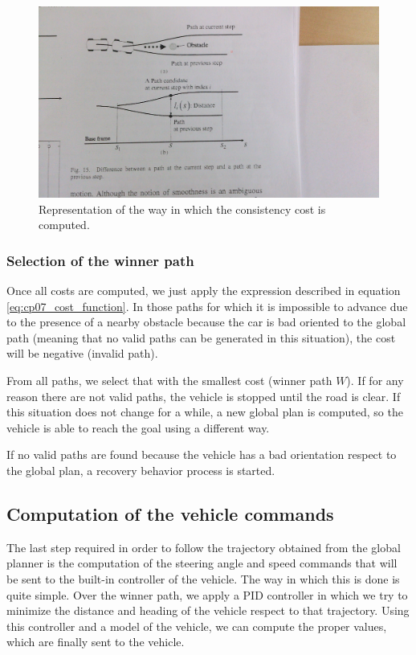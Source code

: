 \begin{figure}[h!]
  \centering
  \includegraphics[width=\textwidth]{consistency_cost}
  \caption{Representation of the way in which the consistency cost is computed.}\label{fig:cp07_consistency_cost}
\end{figure}

\subsubsection{Selection of the winner path}\label{ch:chapter07_01_04_01}

Once all costs are computed, we just apply the expression described in equation \ref{eq:cp07_cost_function}. In those paths for which it is impossible to advance due to the presence of a nearby obstacle because the car is bad oriented to the global path (meaning that no valid paths can be generated in this situation), the cost will be negative (invalid path).

From all paths, we select that with the smallest cost (winner path $W$). If for any reason there are not valid paths, the vehicle is stopped until the road is clear. If this situation does not change for a while, a new global plan is computed, so the vehicle is able to reach the goal using a different way.

If no valid paths are found because the vehicle has a bad orientation respect to the global plan, a recovery behavior process is started.

\subsection{Computation of the vehicle commands}\label{ch:chapter07_01_05}

The last step required in order to follow the trajectory obtained from the global planner is the computation of the steering angle and speed commands that will be sent to the built-in controller of the vehicle. The way in which this is done is quite simple. Over the winner path, we apply a \ac{PID} controller in which we try to minimize the distance and heading of the vehicle respect to that trajectory. Using this controller and a model of the vehicle, we can compute the proper values, which are finally sent to the vehicle.

